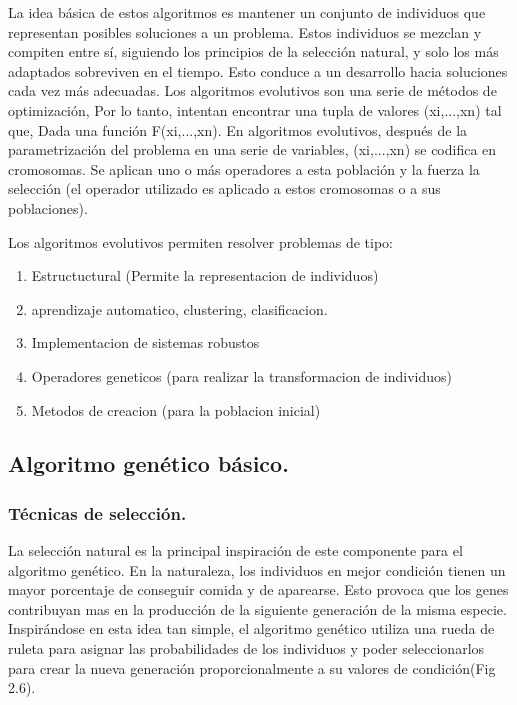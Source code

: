 \documentclass[12pt,letterpaper]{report}
\begin{document}
La idea básica de estos algoritmos es mantener un conjunto de individuos que representan posibles soluciones a un problema. Estos individuos se mezclan y compiten entre sí, siguiendo los principios de la selección natural, y solo los más adaptados sobreviven en el tiempo. Esto conduce a un desarrollo hacia soluciones cada vez más adecuadas.
Los algoritmos evolutivos son una serie de métodos de optimización, Por lo tanto, intentan encontrar una tupla de valores (xi,...,xn) tal que, Dada una función F(xi,...,xn). En algoritmos evolutivos, después de la parametrización del problema en una serie de variables, (xi,...,xn) se codifica en cromosomas. Se aplican uno o más operadores a esta población y la fuerza la selección (el operador utilizado es aplicado a estos cromosomas o a sus poblaciones).

Los algoritmos evolutivos permiten resolver problemas de tipo:


\begin{enumerate}
	\item Estructuctural (Permite la representacion de individuos)
	\item aprendizaje automatico, clustering, clasificacion.
	\item Implementacion de sistemas robustos 
	\item Operadores geneticos (para realizar la transformacion de individuos)
	\item Metodos de creacion (para la poblacion inicial)
\end{enumerate}




\subsection{Algoritmo genético básico.} 
\subsubsection{Técnicas de selección.} 

La selección natural es la principal inspiración de este componente para el algoritmo genético.
En la naturaleza, los individuos en mejor condición tienen un mayor porcentaje de conseguir comida y de aparearse.
Esto provoca que los genes contribuyan mas en la producción de la siguiente generación de la misma especie. Inspirándose en esta idea tan simple, el algoritmo genético utiliza una rueda de ruleta para asignar las probabilidades de los individuos y poder seleccionarlos para crear la nueva generación proporcionalmente a su valores de condición(Fig 2.6).
\\
\end{document}
